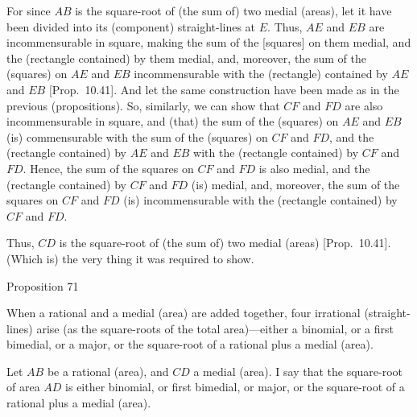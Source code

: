 For since $AB$ is the square-root of (the sum of) two medial (areas),
let it have been divided into its (component) straight-lines at $E$.
Thus, $AE$ and $EB$ are incommensurable in square, making the sum of
the [squares] on them medial, and the (rectangle contained) by them
medial, and, moreover, the sum of the (squares) on $AE$ and $EB$
incommensurable with the (rectangle) contained by $AE$ and $EB$ [Prop.~10.41]. And let the same construction
have been made as in the previous (propositions). So, similarly, we
can show that $CF$ and $FD$ are also incommensurable in square,
and (that) the sum of the (squares) on $AE$ and $EB$ (is)
commensurable with the sum of the (squares) on $CF$ and $FD$, and the
(rectangle contained) by $AE$ and $EB$ with the (rectangle contained)
by $CF$ and $FD$. Hence, the sum of the squares on $CF$ and
$FD$ is also medial, and the (rectangle contained) by $CF$ and $FD$
(is) medial, and, moreover, the sum of the squares on $CF$ and $FD$
(is) incommensurable with the (rectangle contained) by $CF$ and $FD$.

Thus, $CD$ is the square-root of (the sum of) two medial (areas) [Prop.~10.41].
(Which is) the very thing it was required to show.


\begin{center}
{\large Proposition 71}
\end{center}

When a rational and a medial (area) are added
together, four irrational (straight-lines) arise (as the square-roots of the
total area)---either a binomial, or a first bimedial, or a major, or the
square-root of a rational plus a medial (area).

Let $AB$ be a rational (area), and $CD$ a medial (area). I say that the
square-root of area $AD$ is either binomial, or first bimedial, or
major, or the square-root of a rational plus a medial (area).

\centerline{}

